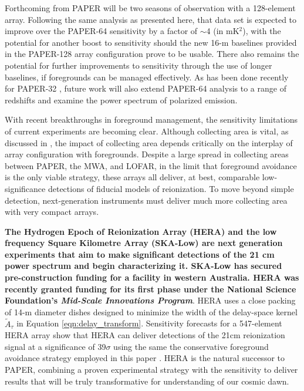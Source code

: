 \documentclass[twocolumn,numberedappendix]{emulateapj} \shorttitle{New Limits on the 21 cm Power Spectrum at $z=8.4$}
\begin{document}
Forthcoming from PAPER will be two seasons of observation with a 128-element array.
Following the same analysis as presented here, that data set is expected to improve 
over the PAPER-64 sensitivity by a factor of $\sim$4 (in mK$^2$), with the potential for another boost to sensitivity
should the new 16-m baselines provided in the PAPER-128 array configuration prove to be
usable.  There also remains the potential for further improvements to sensitivity through the
use of longer baselines, if foregrounds can be managed effectively.
As has been done recently for PAPER-32 \citep{jacobs_et_al2014,moore_et_al2015}, 
future work will also extend PAPER-64 analysis
to a range of redshifts and examine the power spectrum of polarized emission.



With recent breakthroughs in foreground management, the sensitivity 
limitations of current experiments are becoming clear.  Although collecting area is vital,
as discussed in \citet{pober_et_al2014}, the impact of collecting area
depends critically on the interplay of array configuration with foregrounds.
Despite a large spread in collecting areas between PAPER, the MWA, and LOFAR,
in the limit that foreground avoidance is the only viable strategy, these
arrays all deliver, at best, comparable low-significance detections of fiducial models
of reionization.  To move beyond simple detection, next-generation instruments must
deliver much more collecting area with very compact arrays.

\textbf{The Hydrogen Epoch of Reionization Array (HERA) and the low frequency Square Kilometre Array (SKA-Low) are next generation experiments that aim to make significant detections of the 21 cm power spectrum and begin characterizing it. SKA-Low has secured pre-construction funding for a facility in western Australia. HERA was recently granted funding for its first phase under the National Science Foundation's {\it Mid-Scale Innovations Program}}. 
HERA uses a close packing of 14-m diameter
dishes designed to minimize the width of the delay-space kernel
$\tilde{A}_\tau$ in Equation \eqref{eqn:delay_transform}.
Sensitivity forecasts for a 547-element HERA array
show that HERA can deliver detections of the 21cm reionization signal
at a significance of 39$\sigma$ using the same the conservative 
foreground avoidance strategy employed in this paper
\citep{pober_et_al2014}.  HERA is the natural successor
to PAPER, combining a proven experimental strategy with the 
sensitivity to deliver results that will be truly transformative for
understanding of our cosmic dawn.
\end{document}
